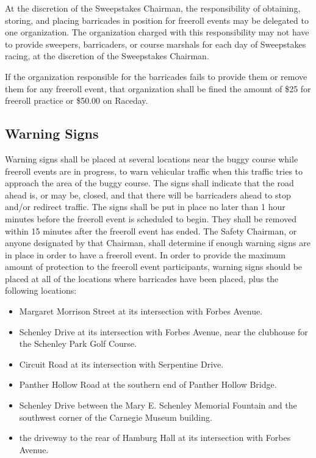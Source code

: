 	At the discretion of the Sweepstakes Chairman, the responsibility of obtaining,
	storing, and placing barricades in position for freeroll events may be
	delegated to one organization. The organization charged with this
	responsibility may not have to provide sweepers, barricaders, or course marshals
	for each day of Sweepstakes racing, at the discretion of the Sweepstakes
	Chairman.

	If the organization responsible for the barricades fails to provide them or
	remove them for any freeroll event, that organization shall be fined
	the amount of \$25 for freeroll practice or \$50.00 on Raceday.

	
\subsection{Warning Signs}
\label{subsec:WarnSigns}

	Warning signs shall be placed at several locations near the buggy course while
	freeroll events are in progress, to warn vehicular traffic when this traffic
	tries to approach the area of the buggy course. The signs shall indicate that
	the road ahead is, or may be, closed, and that there will be barricaders ahead to
	stop and/or redirect traffic. The signs shall be put in place no later than 1 hour
	minutes before the freeroll event is scheduled to begin. They shall be
	removed within 15 minutes after the freeroll event has ended. The Safety
	Chairman, or anyone designated by that Chairman, shall determine if enough
	warning signs are in place in order to have a freeroll event. In order to
	provide the maximum amount of protection to the freeroll event participants,
	warning signs should be placed at all of the locations where barricades have
	been placed, plus the following locations:

	\begin{itemize}
		\item Margaret Morrison Street at its intersection with Forbes Avenue.
		\item Schenley Drive at its intersection with Forbes Avenue, near the clubhouse for the Schenley Park Golf Course.
		\item Circuit Road at its intersection with Serpentine Drive.
		\item Panther Hollow Road at the southern end of Panther Hollow Bridge.
		\item Schenley Drive between the Mary E. Schenley Memorial Fountain and the southwest corner of the Carnegie Museum building.
		\item the driveway to the rear of Hamburg Hall at its intersection with Forbes Avenue.
	\end{itemize}

